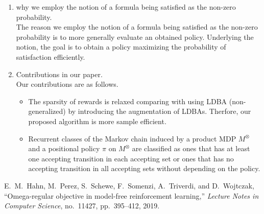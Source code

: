 \documentclass[10 pt, dvipdfmx]{article}
\theoremstyle{definition}
\begin{document}
\begin{enumerate}
  \item why we employ the notion of a formula being satisfied as the non-zero probability. \\
  The reason we employ the notion of a formula being satisfied as the non-zero probability is to more generally evaluate an obtained policy. Underlying the notion, the goal is to obtain a policy maximizing the probability of satisfaction efficiently.

  \item Contributions in our paper. \\
  Our contributions are as follows.
  \begin{itemize}
    \item The sparsity of rewards is relaxed comparing with using LDBA (non-generalized) by introducing the augmentation of LDBAs. Therfore, our proposed algorithm is more sample efficient.
    \item Recurrent classes of the Markov chain induced by a product MDP $M^{\otimes}$ and a positional policy $\pi$ on $M^{\otimes}$ are classified as ones that has at least one accepting transition in each accepting set or ones that has no accepting transition in all accepting sets without depending on the policy.
  \end{itemize}
\end{enumerate}

\begin{thebibliography}{99}
E.\ M.\ Hahn, M.\ Perez, S.\ Schewe, F.\ Somenzi, A.\ Triverdi, and D.\ Wojtczak,
``Omega-regular objective in model-free reinforcement learning,''
\textit{Lecture Notes in Computer Science}, no.\ 11427, pp.\ 395--412, 2019.
\end{thebibliography}
\end{document}
